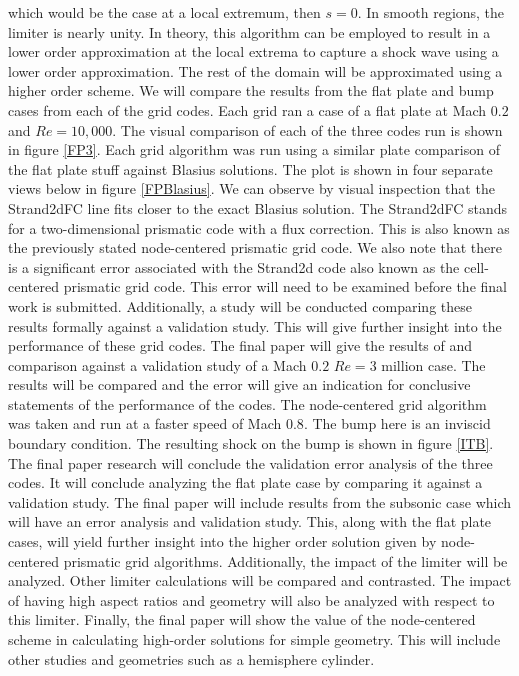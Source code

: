 which would be the case at a local extremum, then $s = 0$. In smooth regions, the limiter is
nearly unity.  
In theory, this algorithm can be employed to result in a lower order approximation at the local extrema to capture a shock wave using a lower order approximation.  The rest of the domain will be approximated using a higher order scheme.  
We will compare the results from the flat plate and bump cases from each of the grid codes.
Each grid ran a case of a flat plate at Mach $0.2$ and $Re = 10,000$.  The visual comparison of each of the three codes run is shown in figure \ref{FP3}.
Each grid algorithm was run using a similar plate comparison of the flat plate stuff against Blasius solutions.  The plot is shown in four separate views below in figure \ref{FPBlasius}.
We can observe by visual inspection that the Strand2dFC line fits closer to the exact Blasius solution.  The Strand2dFC stands for a two-dimensional prismatic code with a flux correction.  This is also known as the previously stated node-centered prismatic grid code.  We also note that there is a significant error associated with the Strand2d code also known as the cell-centered prismatic grid code.  This error will need to be examined before the final work is submitted. 
Additionally, a study will be conducted comparing these results formally against a validation study. This will give further insight into the performance of these grid codes.
The final paper will give the results of and comparison against a validation study of a Mach $0.2$ $Re = 3$ million case.  The results will be compared and the error will give an indication for conclusive statements of the performance of the codes.
The node-centered grid algorithm was taken and run at a faster speed of Mach $0.8$.  The bump here is an inviscid boundary condition.  The resulting shock on the bump is shown in figure \ref{ITB}.
The final paper research will conclude the validation error analysis of the three codes.  It will conclude analyzing the flat plate case by comparing it against a validation study.  
The final paper will include results from the subsonic case which will have an error analysis and validation study.  This, along with the flat plate cases, will yield further insight into the higher order solution given by node-centered prismatic grid algorithms.  
Additionally, the impact of the limiter will be analyzed.  Other limiter calculations will be compared and contrasted.  The impact of having high aspect ratios and geometry will also be analyzed with respect to this limiter.  
Finally, the final paper will show the value of the node-centered scheme in calculating high-order solutions for simple geometry.  This will include other studies and geometries such as a hemisphere cylinder.  
